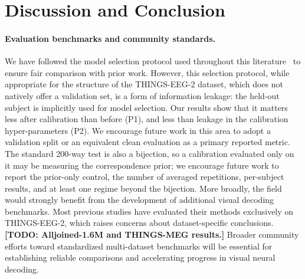 \documentclass[10pt,twocolumn,letterpaper]{article}
\newcommand{\TODO}[1]{\textbf{\color{red}[TODO: #1]}}
\begin{document}
\section{Discussion and Conclusion}
\label{sec:discussion}

\paragraph{Evaluation benchmarks and community standards.}
We have followed the model selection protocol used throughout this literature~\cite{zhang2025neurobridge,du2025shallow,huang2026sattc} to ensure fair comparison with prior work. However, this selection protocol, while appropriate for the structure of the THINGS-EEG-2 dataset, which does not natively offer a validation set, is a form of information leakage: the held-out subject is implicitly used for model selection. Our results show that it matters less after calibration than before (P1), and less than leakage in the calibration hyper-parameters (P2). We encourage future work in this area to adopt a validation split or an equivalent clean evaluation as a primary reported metric. The standard 200-way test is also a bijection, so a calibration evaluated only on it may be measuring the correspondence prior; we encourage future work to report the prior-only control, the number of averaged repetitions, per-subject results, and at least one regime beyond the bijection. More broadly, the field would strongly benefit from the development of additional visual decoding benchmarks. Most previous studies have evaluated their methods exclusively on THINGS-EEG-2, which raises concerns about dataset-specific conclusions. \TODO{Alljoined-1.6M and THINGS-MEG results.} Broader community efforts toward standardized multi-dataset benchmarks will be essential for establishing reliable comparisons and accelerating progress in visual neural decoding.
\end{document}
